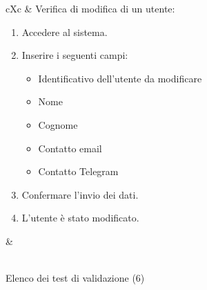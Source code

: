 \begin{table}[H]
\begin{VTtable}[1.7]{\textwidth}{cXc}
        \addtotv & Verifica di modifica di un utente:
		\begin{enumerate}
			\item Accedere al sistema.
            \item Inserire i seguenti campi:
                \begin{itemize}
                    \item Identificativo dell'utente da modificare
                    \item Nome
                    \item Cognome
                    \item Contatto email
                    \item Contatto Telegram
                \end{itemize}
            \item Confermare l'invio dei dati.
            \item L'utente è stato modificato.
		\end{enumerate}
		& \TNI \\
        \bottomrule\\
        \end{VTtable}
	\caption{Elenco dei test di validazione (6)}
\end{table}
